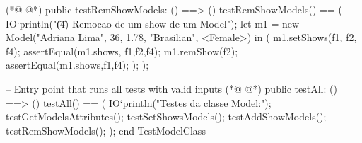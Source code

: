 \begin{vdmpp}[breaklines=true]
(*@
\label{testRemShowModels:60}
@*)
 public testRemShowModels: () ==> ()
 testRemShowModels() == (
    IO`println("\t (4) Remocao de um show de um Model");
    let m1 = new Model("Adriana Lima", 36, 1.78, "Brasilian", <Female>) in (
   m1.setShows({f1, f2, f4});
   assertEqual(m1.shows, {f1,f2,f4});
   m1.remShow(f2);
   assertEqual(m1.shows,{f1,f4});
   );
 );
 
 -- Entry point that runs all tests with valid inputs
(*@
\label{testAll:72}
@*)
  public testAll: () ==> ()
  testAll() == (
  IO`println("Testes da classe Model:");
   testGetModelsAttributes();
   testSetShowsModels();
   testAddShowModels();
   testRemShowModels();
  );
end TestModelClass
\end{vdmpp}

